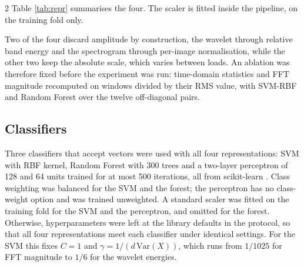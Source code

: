 \documentclass[12pt,twoside,titlepage]{ingenius}
\begin{document}
\begin{multicols}{2}
Table \ref{tab:repr} summarises the four. The scaler is fitted inside the
pipeline, on the training fold only.

\begin{table}[H]
\centering
{}
\label{tab:repr}
\end{table}

Two of the four discard amplitude by construction, the wavelet through relative
band energy and the spectrogram through per-image normalisation, while the other
two keep the absolute scale, which varies between loads. An ablation was therefore
fixed before the experiment was run: time-domain statistics and FFT magnitude
recomputed on windows divided by their RMS value, with SVM-RBF and Random Forest
over the twelve off-diagonal pairs.

\subsection{Classifiers}

Three classifiers that accept vectors were used with all four representations:
SVM with RBF kernel, Random Forest with 300 trees and a two-layer perceptron of
128 and 64 units trained for at most 500 iterations, all from scikit-learn
\cite{pedregosa2011}. Class weighting was balanced for the SVM and the forest;
the perceptron has no class-weight option and was trained unweighted. A standard scaler was
fitted on the training fold for the SVM and the perceptron, and omitted for the
forest. Otherwise, hyperparameters were left at the library defaults in the protocol, so
that all four representations meet each classifier under identical settings.
For the SVM this fixes $C = 1$ and $\gamma = 1/(d\,\mathrm{Var}(X))$, which runs
from $1/1025$ for FFT magnitude to $1/6$ for the wavelet energies.


\end{multicols}
\end{document}
